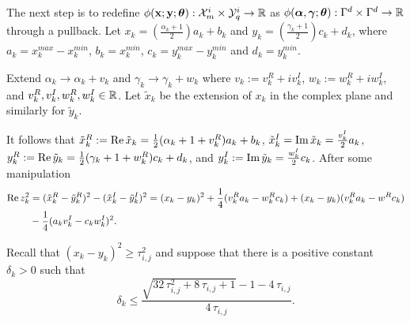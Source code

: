 \documentclass[11pt,final]{amsart}       %
\begin{document}

The next step is to redefine $\phi(\mathbf{x};\mathbf{y};\boldsymbol{\theta}):\mathcal{X}^{i}_m \times
\mathcal{Y}^{i}_{q} \rightarrow \Bbb{R}$ as
$\phi(\boldsymbol{\alpha},\boldsymbol{\gamma};\boldsymbol{\theta}):\Gamma^d \times \Gamma^d \rightarrow
\Bbb{R}$ through a pullback. Let $x_k = \left(\frac{\alpha_k + 1}{2}
\right) a_k + b_k$ and $y_k = \left(\frac{\gamma_k + 1}{2} \right) c_k
+ d_k$, where $a_k = x^{max}_{k} - x^{min}_{k}$, $b_k = x^{min}_{k}$,
$c_k = y^{max}_{k} - y^{min}_{k}$ and $d_k = y^{min}_{k}$.



Extend $\alpha_k \rightarrow \alpha_k + v_k$ and $\gamma_k
\rightarrow \gamma_k + w_k$ where $v_k:= v^R_k + iv^I_k$, $w_k:= w^R_k
+ iw^I_k$, and $v^R_k,v^I_k,w^R_k,w^I_k \in \Bbb{R}$. Let $\tilde x_k$ be
the extension of $x_k$ in the complex plane and similarly for
$\tilde y_k$.


It follows that $\tilde x^R_k := \mathop{\text{\rm Re}} \tilde x_k = \frac{1}{2}
(\alpha_k + 1 + v^R_k)a_k + b_k$, $\tilde x^I_k = \mathop{\text{\rm Im}} \tilde x_k =
\frac{v^I_k}{2} a_k$, $y^R_k := \mathop{\text{\rm Re}} \tilde y_k = \frac{1}{2}
(\gamma_k + 1 + w^R_k)c_k + d_k$, and $y^I_k := \mathop{\text{\rm Im}} \tilde y_k =
\frac{w^I_k}{2} c_k$.  After some manipulation
\begin{equation}
\begin{split}
\mathop{\text{\rm Re}} z^2_k &= (\tilde x^R_k - \tilde y^R_k)^2
- (\tilde x^I_k - \tilde y^I_k)^2 
=
(x_k - y_k)^2 
+
\frac{1}{4}(v^R_k a_k - w^R_k c_k)
+ (x_k - y_k)(v^R_k a_k - w^R c_k)
\\
&
-\frac{1}{4}(a_kv^I_k - c_k w^I_k)^2.
\end{split}
\label{errorestimates:eqn2}
\end{equation}


Recall that $(x_k - y_k)^2 \geq \tau^2_{i,j}$ and suppose that there
is a positive constant $\delta_{k} > 0 $ such that
\begin{equation}
\delta_{k} \leq 
\frac{\sqrt{32\,\tau_{i,j} ^2+8\,\tau_{i,j} +1}-1 - 4\,\tau_{i,j}  }{4\,\tau_{i,j}}.
\label{errorestimates:eqn2a}
\end{equation}
\end{document}
